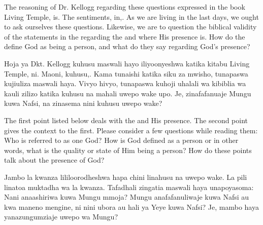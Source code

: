 The reasoning of Dr. Kellogg regarding these questions expressed in the book Living Temple, is. The sentiments, in,. As we are living in the last days, we ought to ask ourselves these questions. Likewise, we are to question the biblical validity of the statements in the  regarding the  and where His presence is. How do the  define God as being a person, and what do they say regarding God’s presence?


Hoja ya Dkt. Kellogg kuhusu maswali hayo iliyoonyeshwa katika kitabu Living Temple, ni. Maoni, kuhusu,. Kama tunaishi katika siku za mwisho, tunapaswa kujiuliza maswali haya. Vivyo hivyo, tunapaswa kuhoji uhalali wa kibiblia wa kauli zilizo katika  kuhusu  na mahali uwepo wake upo. Je,  zinafafanuaje Mungu kuwa Nafsi, na zinasema nini kuhusu uwepo wake?


The first point listed below deals with the  and His presence. The second point gives the context to the first. Please consider a few questions while reading them: Who is referred to as one God? How is God defined as a person or in other words, what is the quality or state of Him being a person? How do these points talk about the presence of God?


Jambo la kwanza lililoorodheshwa hapa chini linahusu  na uwepo wake. La pili linatoa muktadha wa la kwanza. Tafadhali zingatia maswali haya unapoyasoma: Nani anaashiriwa kuwa Mungu mmoja? Mungu anafafanuliwaje kuwa Nafsi au kwa maneno mengine, ni nini ubora au hali ya Yeye kuwa Nafsi? Je, mambo haya yanazungumziaje uwepo wa Mungu?




